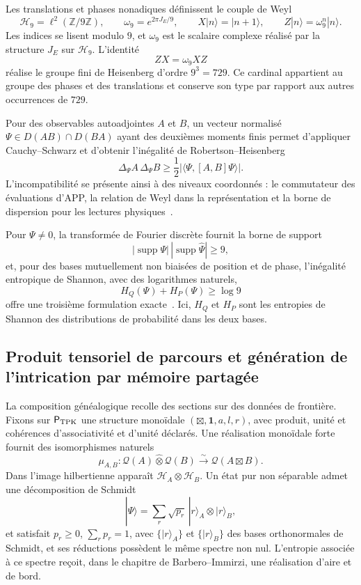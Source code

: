 Les translations et phases nonadiques définissent le couple de Weyl
\[
 \mathcal H_9=\ell^2(\mathbb Z/9\mathbb Z),
 \qquad
 \omega_9=e^{2\pi J_E/9},
 \qquad
 X|n\rangle=|n+1\rangle,
 \qquad
 Z|n\rangle=\omega_9^n|n\rangle.
\]
Les indices se lisent modulo \(9\), et \(\omega_9\) est le scalaire complexe réalisé par la structure \(J_E\) sur \(\mathcal H_9\). L’identité
\[
 ZX=\omega_9XZ
\]
réalise le groupe fini de Heisenberg d’ordre \(9^3=729\). Ce cardinal appartient au groupe des phases et des translations et conserve son type par rapport aux autres occurrences de \(729\).

Pour des observables autoadjointes \(A\) et \(B\), un vecteur normalisé \(\Psi\in D(AB)\cap D(BA)\) ayant des deuxièmes moments finis permet d’appliquer Cauchy--Schwarz et d’obtenir l’inégalité de Robertson--Heisenberg
\begin{equation}
 \Delta_\Psi A\,\Delta_\Psi B
 \geq\frac12
 \bigl|\langle\Psi,[A,B]\Psi\rangle\bigr|.
 \label{eq:robertson-hmt-rev2}
\end{equation}
L’incompatibilité se présente ainsi à des niveaux coordonnés : le commutateur des évaluations d’APP, la relation de Weyl dans la représentation et la borne de dispersion pour les lectures physiques~\cite{Heisenberg1927,Robertson1929}.

Pour \(\Psi\neq0\), la transformée de Fourier discrète fournit la borne de support
\[
 |\operatorname{supp}\Psi|\,
 |\operatorname{supp}\widehat\Psi|\geq9,
\]
et, pour des bases mutuellement non biaisées de position et de phase, l’inégalité entropique de Shannon, avec des logarithmes naturels,
\[
 H_Q(\Psi)+H_P(\Psi)\geq\log9
\]
offre une troisième formulation exacte~\cite{MaassenUffink1988}. Ici, \(H_Q\) et \(H_P\) sont les entropies de Shannon des distributions de probabilité dans les deux bases.

\subsection{Produit tensoriel de parcours et génération de l’intrication par mémoire partagée}

La composition généalogique recolle des sections sur des données de frontière. Fixons sur \(\mathsf P_{\rm TPK}\) une structure monoïdale \((\boxtimes,\mathbf 1,a,l,r)\), avec produit, unité et cohérences d’associativité et d’unité déclarés. Une réalisation monoïdale forte fournit des isomorphismes naturels
\[
 \mu_{A,B}:
 \mathcal Q(A)\widehat\otimes\mathcal Q(B)
 \xrightarrow{\sim}\mathcal Q(A\boxtimes B).
\]
Dans l’image hilbertienne apparaît \(\mathcal H_A\otimes\mathcal H_B\). Un état pur non séparable admet une décomposition de Schmidt
\[
 |\Psi\rangle
 =\sum_r\sqrt{p_r}\,|r\rangle_A\otimes|r\rangle_B,
\]
et satisfait \(p_r\geq0\), \(\sum_rp_r=1\), avec \(\{|r\rangle_A\}\) et \(\{|r\rangle_B\}\) des bases orthonormales de Schmidt, et ses réductions possèdent le même spectre non nul. L’entropie associée à ce spectre reçoit, dans le chapitre de Barbero--Immirzi, une réalisation d’aire et de bord.

